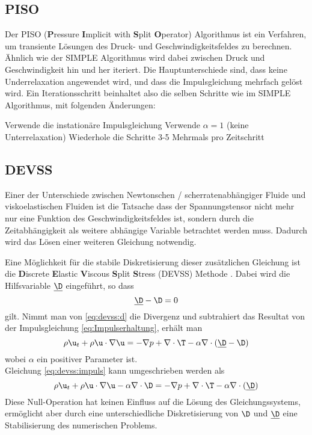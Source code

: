 \subsection{PISO}
Der \mbox{PISO} (\textbf{P}ressure \textbf{I}mplicit with \textbf{S}plit \textbf{O}perator)  Algorithmus ist ein Verfahren, um transiente Lösungen des Druck- und Geschwindigkeitsfeldes zu berechnen.\\
Ähnlich wie der \mbox{SIMPLE} Algorithmus wird dabei zwischen Druck und Geschwindigkeit hin und her iteriert. Die Hauptunterschiede sind, dass keine Underrelaxation angewendet wird, und dass die Impulsgleichung mehrfach gelöst wird. Ein Iterationsschritt beinhaltet also die selben Schritte wie im \mbox{SIMPLE} Algorithmus, mit folgenden Änderungen:
\begin{outline}
    \1[2.] Verwende die instationäre Impulsgleichung
    \1[4.] Verwende $\alpha=1$ (keine Unterrelaxation)
    \1[6.] Wiederhole die Schritte 3-5 Mehrmals pro Zeitschritt
\end{outline}

\subsection{DEVSS}
Einer der Unterschiede zwischen Newtonschen / scherratenabhängiger Fluide  und viskoelastischen Fluiden ist die Tatsache dass der Spannungstensor nicht mehr nur eine Funktion des Geschwindigkeitsfeldes ist, sondern durch die Zeitabhängigkeit als weitere abhängige Variable betrachtet werden muss. Dadurch wird das Lösen einer weiteren Gleichung notwendig.

Eine Möglichkeit für die stabile Diskretisierung dieser zusätzlichen Gleichung ist die \textbf{D}iscrete \textbf{E}lastic \textbf{V}iscous \textbf{S}plit \textbf{S}tress (DEVSS) Methode \cite{devss}.
Dabei wird die Hilfsvariable $\underline{\D}$ eingeführt, so dass 
\begin{equation}
    \label{eq:devss:d}
    \underline{\D} - \D= 0
\end{equation}
gilt. Nimmt man von \eqref{eq:devss:d} die Divergenz und subtrahiert das Resultat von der Impulsgleichung \eqref{eq:Impulserhaltung}, erhält man
\begin{equation}
    \label{eq:devss:impuls}
    \rho \u _t + \rho \u \cdot \nabla\u = -\nabla p +\nabla \cdot \T - \alpha \nabla \cdot \left( \underline{\D}-\D \right)
\end{equation}
wobei $\alpha$ ein positiver Parameter ist.\\
Gleichung \eqref{eq:devss:impuls} kann umgeschrieben werden als
\begin{equation}
    \label{eq:devss:impuls2}
    \rho \u _t + \rho \u \cdot \nabla\u -\alpha \nabla \cdot \D= -\nabla p +\nabla \cdot \T - \alpha \nabla \cdot \left( \underline{\D} \right)
\end{equation}
Diese Null-Operation hat keinen Einfluss auf die Lösung des Gleichungssystems, ermöglicht aber durch eine unterschiedliche Diskretisierung von $\D$ und $\underline{\D}$ eine Stabilisierung des numerischen Problems.

